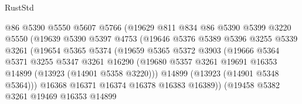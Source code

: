 \begin{lexlean}{RustStd}
\begin{coremodule}
                              @86
                              @5390
                              @5550
                              @5607
                              @5766
                              (@19629
                                @811
                                @834
                                @86
                                @5390
                                @5399
                                @3220
                                @5550
                                (@19639
                                  @5390
                                  @5397
                                  @4753
                                  (@19646
                                    @5376
                                    @5389
                                    @5396
                                    @3255
                                    @5339
                                    @3261
                                    (@19654
                                      @5365
                                      @5374
                                      (@19659
                                        @5365
                                        @5372
                                        @3903
                                        (@19666
                                          @5364
                                          @5371
                                          @3255
                                          @5347
                                          @3261
                                          @16290
                                          (@19680
                                            @5357
                                            @3261
                                            @19691
                                            @16353
                                            @14899
                                            (@13923 (@14901 @5358 @3220)))
                                          @14899
                                          (@13923 (@14901 @5348 @5364)))
                                        @16368
                                        @16371
                                        @16374
                                        @16378
                                        @16383
                                        @16389))
                                    (@19458
                                      @5382
                                      @3261
                                      @19469
                                      @16353
                                      @14899

\end{coremodule}
\end{lexlean}
